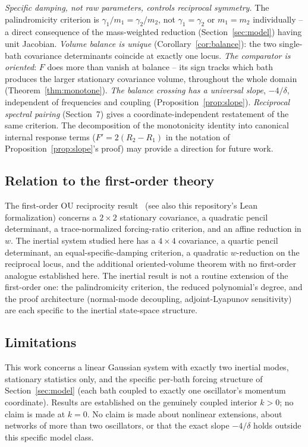 \documentclass[11pt]{article}
\theoremstyle{definition}
\begin{document}
\emph{Specific damping, not raw parameters, controls reciprocal
symmetry.} The palindromicity criterion is $\gamma_1/m_1=\gamma_2/m_2$,
not $\gamma_1=\gamma_2$ or $m_1=m_2$ individually -- a direct consequence
of the mass-weighted reduction (Section~\ref{sec:model}) having unit
Jacobian. \emph{Volume balance is unique} (Corollary~\ref{cor:balance}):
the two single-bath covariance determinants coincide at exactly one
locus. \emph{The comparator is oriented}: $F$ does more than vanish at
balance -- its sign tracks which bath produces the larger stationary
covariance volume, throughout the whole domain
(Theorem~\ref{thm:monotone}). \emph{The balance crossing has a universal
slope}, $-4/\delta$, independent of frequencies and coupling
(Proposition~\ref{prop:slope}). \emph{Reciprocal spectral pairing}
(Section~7) gives a coordinate-independent restatement of the same
criterion. The decomposition of the monotonicity identity into canonical
internal response terms ($F'=2(R_2-R_1)$ in the notation of
Proposition~\ref{prop:slope}'s proof) may provide a direction for future
work.

\subsection{Relation to the first-order theory}

The first-order OU reciprocity result~\cite{dejesus2026heterogeneity} (see
also this repository's Lean formalization) concerns a $2\times2$
stationary covariance, a quadratic pencil determinant, a trace-normalized
forcing-ratio criterion, and an affine reduction in $w$. The inertial
system studied here has a $4\times4$ covariance, a quartic pencil
determinant, an equal-specific-damping criterion, a quadratic
$w$-reduction on the reciprocal locus, and the additional oriented-volume
theorem with no first-order analogue established here. The inertial
result is not a routine extension of the first-order one: the
palindromicity criterion, the reduced polynomial's degree, and the proof
architecture (normal-mode decoupling, adjoint-Lyapunov sensitivity) are
each specific to the inertial state-space structure.

\subsection{Limitations}

This work concerns a linear Gaussian system with exactly two inertial
modes, stationary statistics only, and the specific per-bath forcing
structure of Section~\ref{sec:model} (each bath coupled to exactly one
oscillator's momentum coordinate). Results are established on the
genuinely coupled interior $k>0$; no claim is made at $k=0$. No claim is
made about nonlinear extensions, about networks of more than two
oscillators, or that the exact slope $-4/\delta$ holds outside this
specific model class.
\end{document}
